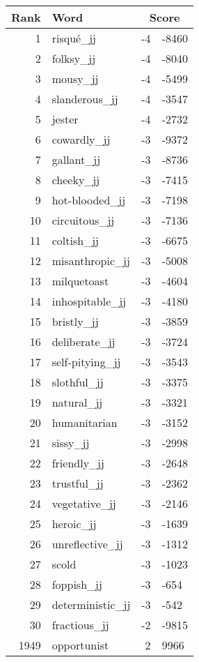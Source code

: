 \begin{longtable}[!htbp]{| rlr@{.}l |}
    \hline
    \textbf{Rank} & \textbf{Word} & \multicolumn{2}{c|}{\textbf{Score}} \\
    \hline
    \endhead
    1 & risqué\_jj & -4 & -8460 \\
    2 & folksy\_jj & -4 & -8040 \\
    3 & mousy\_jj & -4 & -5499 \\
    4 & slanderous\_jj & -4 & -3547 \\
    5 & jester & -4 & -2732 \\
    6 & cowardly\_jj & -3 & -9372 \\
    7 & gallant\_jj & -3 & -8736 \\
    8 & cheeky\_jj & -3 & -7415 \\
    9 & hot-blooded\_jj & -3 & -7198 \\
    10 & circuitous\_jj & -3 & -7136 \\
    11 & coltish\_jj & -3 & -6675 \\
    12 & misanthropic\_jj & -3 & -5008 \\
    13 & milquetoast & -3 & -4604 \\
    14 & inhospitable\_jj & -3 & -4180 \\
    15 & bristly\_jj & -3 & -3859 \\
    16 & deliberate\_jj & -3 & -3724 \\
    17 & self-pitying\_jj & -3 & -3543 \\
    18 & slothful\_jj & -3 & -3375 \\
    19 & natural\_jj & -3 & -3321 \\
    20 & humanitarian & -3 & -3152 \\
    21 & sissy\_jj & -3 & -2998 \\
    22 & friendly\_jj & -3 & -2648 \\
    23 & trustful\_jj & -3 & -2362 \\
    24 & vegetative\_jj & -3 & -2146 \\
    25 & heroic\_jj & -3 & -1639 \\
    26 & unreflective\_jj & -3 & -1312 \\
    27 & scold & -3 & -1023 \\
    28 & foppish\_jj & -3 & -654 \\
    29 & deterministic\_jj & -3 & -542 \\
    30 & fractious\_jj & -2 & -9815 \\
    1949 & opportunist & 2 & 9966 \\

\end{longtable}
